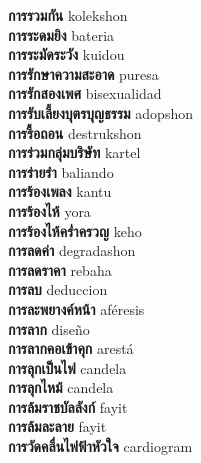 \textbf{ การรวมกัน  } kolekshon \\
\textbf{ การระดมยิง  } bateria \\
\textbf{ การระมัดระวัง  } kuidou \\
\textbf{ การรักษาความสะอาด  } puresa \\
\textbf{ การรักสองเพศ  } bisexualidad \\
\textbf{ การรับเลี้ยงบุตรบุญธรรม  } adopshon \\
\textbf{ การรื้อถอน  } destrukshon \\
\textbf{ การร่วมกลุ่มบริษัท  } kartel \\
\textbf{ การร่ายรำ  } baliando \\
\textbf{ การร้องเพลง  } kantu \\
\textbf{ การร้องไห้  } yora \\
\textbf{ การร้องไห้คร่ำครวญ  } keho \\
\textbf{ การลดค่า  } degradashon \\
\textbf{ การลดราคา  } rebaha \\
\textbf{ การลบ  } deduccion \\
\textbf{ การละพยางค์หน้า  } aféresis \\
\textbf{ การลาก  } diseño \\
\textbf{ การลากคอเข้าคุก  } arestá \\
\textbf{ การลุกเป็นไฟ  } candela \\
\textbf{ การลุกไหม้  } candela \\
\textbf{ การล้มราชบัลลังก์  } fayit \\
\textbf{ การล้มละลาย  } fayit \\
\textbf{ การวัดคลื่นไฟฟ้าหัวใจ  } cardiogram \\
